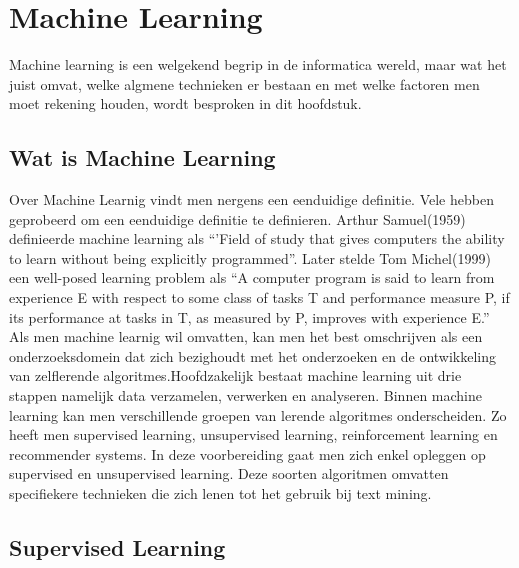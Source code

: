 \chapter{Machine Learning}\label{Machine Learning}

Machine learning is een welgekend begrip in de informatica wereld, maar wat het juist omvat, welke algmene technieken er bestaan en met welke factoren men moet rekening houden, wordt besproken in dit hoofdstuk.

\section{Wat is Machine Learning}\label{Wat is Machine Learning}

Over Machine Learnig vindt men nergens een eenduidige definitie. Vele hebben geprobeerd om een eenduidige definitie te definieren. Arthur Samuel(1959) definieerde machine learning als ``'Field of study that gives computers the ability to learn without being explicitly programmed''. Later stelde Tom Michel(1999) een well-posed learning problem als ``A computer program is said to learn from experience E with respect to some class of tasks T and performance measure P, if its performance at tasks in T, as measured by P, improves with experience E.'' Als men machine learnig wil omvatten, kan men het best omschrijven als een onderzoeksdomein dat zich bezighoudt met het onderzoeken en de ontwikkeling van zelflerende algoritmes.Hoofdzakelijk bestaat machine learning uit drie stappen namelijk data verzamelen, verwerken en analyseren.
\newline
Binnen machine learning kan men verschillende groepen van lerende algoritmes onderscheiden. Zo heeft men supervised learning, unsupervised learning, reinforcement learning en recommender systems. In deze voorbereiding gaat men zich enkel opleggen op supervised en unsupervised learning. Deze soorten algoritmen omvatten specifiekere technieken die zich lenen tot het gebruik bij text mining.


\section{Supervised Learning}\label{Supervised Learning}

